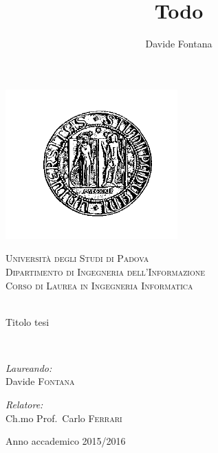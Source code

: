 \documentclass[12pt,a4paper,twoside,openright]{book}
\title{Todo}
\author{Davide Fontana}
\date{}
\begin{document}
\begin{titlepage}
 
\begin{center}
 
\includegraphics[scale=.5]{img/logoBlack}
 
\textsc{\LARGE Università degli Studi di Padova}\\[1.5cm]
 
\textsc{\Large Dipartimento di Ingegneria dell'Informazione\\[0.2cm] Corso di Laurea in Ingegneria Informatica}\\[0.8cm]
  
\\[0.8cm]{\Huge \doublespacing\bfseries \begin{spacing}{1}{Titolo tesi}\end{spacing}}
\\[2cm]
 
\begin{minipage}{0.4\textwidth}
\begin{flushleft} \large
\emph{Laureando:}\\
Davide \textsc{Fontana}
\end{flushleft}
\end{minipage}
\begin{minipage}{0.4\textwidth}
\begin{flushright} \large
\emph{Relatore:} \\
Ch.mo Prof.\ Carlo \textsc{Ferrari}
\end{flushright}
\end{minipage}
 
\vfill
 
{\large Anno accademico 2015/2016}
 
\end{center}
 
\end{titlepage}
\end{document}
